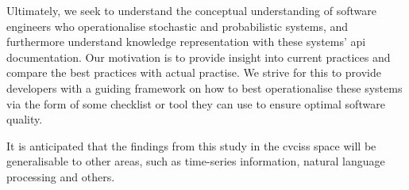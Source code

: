 Ultimately, we seek to understand the conceptual understanding of software engineers who operationalise stochastic and probabilistic systems, and furthermore understand knowledge representation with these systems' \gls{api} documentation. Our motivation is to provide insight into current practices and compare the best practices with actual practise. We strive for this to  provide developers with a guiding framework on how to best operationalise these systems via the form of some checklist or tool they can use to ensure optimal software quality.

It is anticipated that the findings from this study in the \glspl{cvcis} space will be generalisable to other areas, such as time-series information, natural language processing and others.
